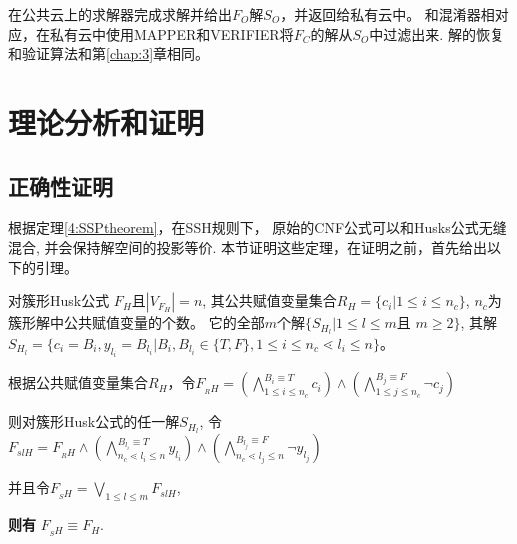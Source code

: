 在公共云上的求解器完成求解并给出$F_O$解$S_O$，并返回给私有云中。
和混淆器相对应，在私有云中使用MAPPER和VERIFIER将$F_C$的解从$S_O$中过滤出来.
解的恢复和验证算法和第\ref{chap:3}章相同。
%
%

\section{理论分析和证明}
\subsection{正确性证明}\label{4:correctness}

根据定理\ref{4:SSPtheorem}，在SSH规则下，
原始的CNF公式可以和Husks公式无缝混合, 并会保持解空间的投影等价.
本节证明这些定理，在证明之前，首先给出以下的引理。

\begin{lemma}\label{4:CHE}

对簇形Husk公式 ${F_H}$且$|V_{F_H}|= n$,
其公共赋值变量集合$R_H=\{c_i|1\leqslant i\leqslant n_c\}$,
$n_c$为簇形解中公共赋值变量的个数。
它的全部$m$个解$\{S_{H_l}|1\leqslant l\leqslant m $且 $m \geqslant 2\}$,
其解
$S_{H_l}=\{c_i=B_i, y_{l_i}=B_{l_i}|B_i,B_{l_i} \in \{T,F\}, 1\leqslant i\leqslant n_c \lessdot {l_i}\leqslant n\}$。


根据公共赋值变量集合$R_H$，令$F_{_RH}=
(\bigwedge_{1\leqslant i\leqslant n_c}^{B_i\equiv T} c_i)\wedge
(\bigwedge_{1\leqslant j\leqslant n_c}^{B_j\equiv F}\neg c_j)$

则对簇形Husk公式的任一解$S_{H_l}$, 令$F_{slH}=F_{_RH}\wedge
(\bigwedge_{n_c\lessdot l_i\leqslant n}^{B_{l_i}\equiv T} y_{l_i})\wedge
(\bigwedge_{n_c\lessdot l_j\leqslant n}^{B_{l_j}\equiv F}\neg y_{l_j})$

并且令$F_{_SH}=\bigvee_{1\leqslant l\leqslant m}F_{slH}$,

\textbf{则有}  $F_{_SH} \equiv F_H $.
\end{lemma}

